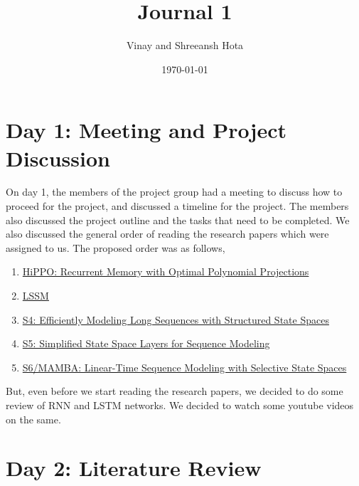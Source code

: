 \documentclass[11pt]{scrartcl}
\title{Journal 1}
\author{Vinay and Shreeansh Hota}
\date{\today}
\begin{document}
\maketitle

\tableofcontents

\section{Day 1: Meeting and Project Discussion}

On day 1, the members of the project group had a meeting to discuss how to proceed for the project, and discussed a timeline for the project. The members also discussed the project outline and the tasks that need to be completed. We also discussed the general order of reading the research papers which were assigned to us. The proposed order was as follows,

\begin{enumerate}
    \item \href{https://arxiv.org/pdf/2008.07669}{HiPPO: Recurrent Memory with Optimal Polynomial Projections}
    \item \href{https://arxiv.org/pdf/2110.13985}{LSSM}
    \item \href{https://arxiv.org/pdf/2111.00396}{S4: Efficiently Modeling Long Sequences with Structured State Spaces}
    \item \href{https://arxiv.org/pdf/2208.04933}{S5: Simplified State Space Layers for Sequence Modeling}
    \item \href{https://arxiv.org/pdf/2312.00752}{S6/MAMBA: Linear-Time Sequence Modeling with Selective State Spaces}
\end{enumerate}

But, even before we start reading the research papers, we decided to do some review of RNN and LSTM networks. We decided to watch some youtube videos on the same.

\section{Day 2: Literature Review}
\end{document}
